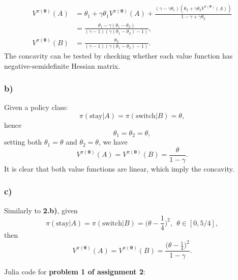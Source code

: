 \documentclass[12pt]{article}
\begin{document}
\begin{equation*}
    \begin{split}
        V^{\pi(\boldsymbol\theta)}(A) &= \theta_1 + \gamma\theta_1V^{\pi(\boldsymbol\theta)}(A) + \frac{(\gamma - \gamma\theta_1)(\theta_2 + \gamma\theta_2V^{\pi(\boldsymbol\theta)}(A))}{1-\gamma+\gamma\theta_2}     \\
        &= \frac{\theta_1 - \gamma(\theta_1 - \theta_2)}{(\gamma-1)(\gamma(\theta_1 - \theta_2)-1)}, \\
        V^{\pi(\boldsymbol\theta)}(B) &= \frac{\theta_2}{(\gamma-1)(\gamma(\theta_1 - \theta_2)-1)}.
    \end{split}
\end{equation*}
The concavity can be tested by checking whether each value function has negative-semidefinite Hessian matrix.
\subsubsection*{b)}
Given a policy class:
\begin{equation}
    \pi(\text{stay}|A) = \pi(\text{switch}|B) = \theta,
\end{equation}
hence
\begin{equation*}
    \theta_1 = \theta_2 = \theta,
\end{equation*}
setting both $\theta_1 = \theta$ and $\theta_2 = \theta$, we have
\begin{equation*}
    V^{\pi(\boldsymbol\theta)}(A) = V^{\pi(\boldsymbol\theta)}(B) = \frac{\theta}{1-\gamma}.
\end{equation*}
It is clear that both value functions are linear, which imply the concavity.
\subsubsection*{c)}
Similarly to \textbf{2.b)}, given
\begin{equation*}
    \pi(\text{stay}|A) = \pi(\text{switch}|B) = \Big(\theta - \frac{1}{4}\Big)^2, ~~ \theta \in [0, 5/4],
\end{equation*}
then
\begin{equation*}
    V^{\pi(\boldsymbol\theta)}(A) = V^{\pi(\boldsymbol\theta)}(B) = \frac{\Big(\theta - \frac{1}{4}\Big)^2}{1-\gamma}.
\end{equation*}

\newpage
\begin{appendices}
    Julia code for \textbf{problem 1 of assignment 2}:
\end{appendices}
\end{document}
